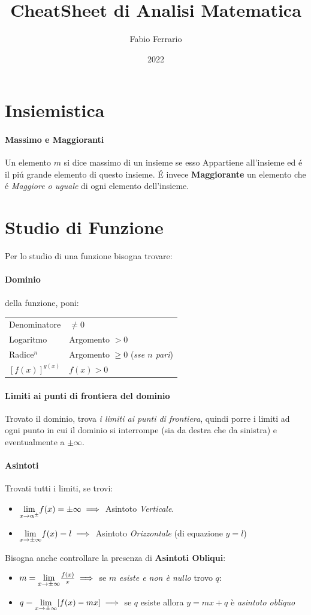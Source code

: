 \documentclass[12pt, a4paper]{article}
\begin{document}
\title{CheatSheet di Analisi Matematica}
\author{Fabio Ferrario}
\date{2022}
\maketitle

\section*{Insiemistica}
\paragraph*{Massimo e Maggioranti}
Un elemento $m$ si dice massimo di un insieme se esso Appartiene all'insieme ed é il piú grande elemento di questo insieme.
É invece \textbf{Maggiorante} un elemento che é \emph{Maggiore o uguale} di ogni elemento dell'insieme.
\section*{Studio di Funzione}
Per lo studio di una funzione bisogna trovare:
\paragraph*{Dominio} della funzione, poni:\\

\begin{tabular}{ l|l }
	Denominatore    & $\neq 0$                                 \\
	Logaritmo       & Argomento $>0$                           \\
	Radice$^n$      & Argomento $\geq 0$ (\emph{sse $n$ pari}) \\
	$[f(x)]^{g(x)}$ & $f(x)>0$
\end{tabular}
\paragraph*{Limiti ai punti di frontiera del dominio}
Trovato il dominio, trova \emph{i limiti ai punti di frontiera},
quindi porre i limiti ad ogni punto in cui il dominio si interrompe (sia da destra che da sinistra) e eventualmente a $\pm \infty$.
\paragraph*{Asintoti}
Trovati tutti i limiti, se trovi:
\begin{itemize}
	\item $\underset{x \to \alpha^\pm}{\lim} f(x) = \pm \infty \implies$ Asintoto \emph{Verticale}.
	\item $\underset{x \to \pm \infty}{\lim} f(x) = l \implies$ Asintoto \emph{Orizzontale} (di equazione $y=l$)
\end{itemize}
Bisogna anche controllare la presenza di \textbf{Asintoti Obliqui}:
\begin{itemize}
	\item $m = \underset{x \to \pm \infty}{\lim} \frac{f(x)}{x} \implies$ se $m$ \emph{esiste e non è nullo} trovo $q$:
	\item $q = \underset{x \to \pm \infty}{\lim} [f(x) - mx]\implies$  se $q$ esiste allora $y=mx+q$ è \emph{asintoto obliquo}
\end{itemize}
\end{document}
